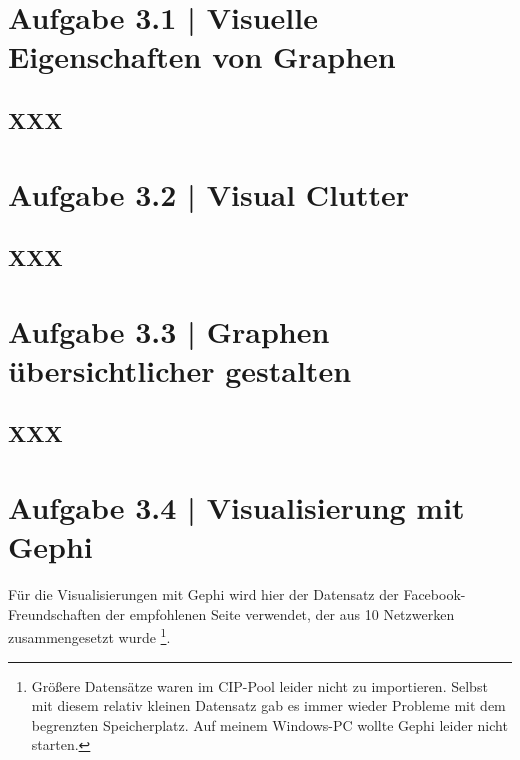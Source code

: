 \documentclass[a4paper,12pt,ngerman]{scrartcl}
\begin{document}
\pagestyle{fancy} %

\section{Aufgabe 3.1 | Visuelle Eigenschaften von Graphen}
\subsection*{XXX}

\section{Aufgabe 3.2 | Visual Clutter}
\subsection*{XXX}

\section{Aufgabe 3.3 | Graphen übersichtlicher gestalten}
\subsection*{XXX}

\section{Aufgabe 3.4 | Visualisierung mit Gephi}

%

Für die Visualisierungen mit Gephi wird hier der Datensatz der Facebook-Freundschaften der empfohlenen Seite verwendet, der aus 10 Netzwerken zusammengesetzt wurde \footnote{Größere Datensätze waren im CIP-Pool leider nicht zu importieren. Selbst mit diesem relativ kleinen Datensatz gab es immer wieder Probleme mit dem begrenzten Speicherplatz. Auf meinem Windows-PC wollte Gephi leider nicht starten.}.
\end{document}
